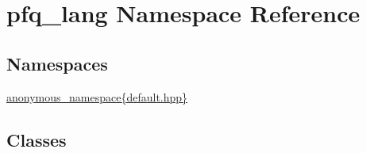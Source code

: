 \hypertarget{namespacepfq__lang}{\section{pfq\+\_\+lang Namespace Reference}
\label{namespacepfq__lang}
}
\subsection*{Namespaces}
\begin{DoxyCompactItemize}
\item 
 \hyperlink{namespacepfq__lang_1_1anonymous__namespace_02default_8hpp_03}{anonymous\+\_\+namespace\{default.\+hpp\}}
\end{DoxyCompactItemize}
\subsection*{Classes}
